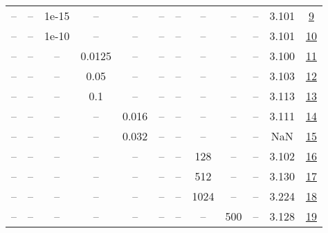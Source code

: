 \begin{table}[H]
\begin{tabular}{cccccccccccc}
-- & -- & 1e-15 & -- & -- & -- & -- & -- & -- & -- & 3.101 & \href{https://wandb.ai/stanford-mercury/optimizer-scaling/runs/sweep-520m-10B-mars77342alr0.008-wd0.1-minlr0-warmup2000-b10.95--6c9adf}{9} \\
-- & -- & 1e-10 & -- & -- & -- & -- & -- & -- & -- & 3.101 & \href{https://wandb.ai/stanford-mercury/optimizer-scaling/runs/sweep-520m-10B-marsa92a9dlr0.008-wd0.1-minlr0-warmup2000-b10.95--391f57}{10} \\
-- & -- & -- & 0.0125 & -- & -- & -- & -- & -- & -- & 3.100 & \href{https://wandb.ai/stanford-mercury/optimizer-scaling/runs/sweep-520m-10B-marsb386c8lr0.008-wd0.1-minlr0-warmup2000-b10.95--e1ca32}{11} \\
-- & -- & -- & 0.05 & -- & -- & -- & -- & -- & -- & 3.103 & \href{https://wandb.ai/stanford-mercury/optimizer-scaling/runs/sweep-520m-10B-marse74b34lr0.008-wd0.1-minlr0-warmup2000-b10.95--902394}{12} \\
-- & -- & -- & 0.1 & -- & -- & -- & -- & -- & -- & 3.113 & \href{https://wandb.ai/stanford-mercury/optimizer-scaling/runs/sweep-520m-10B-marst656743lr0.008-wd0.1-minlr0-warmup2000-b10.95-796b89}{13} \\
-- & -- & -- & -- & 0.016 & -- & -- & -- & -- & -- & 3.111 & \href{https://wandb.ai/stanford-mercury/optimizer-scaling/runs/sweep-520m-10B-mars1ad142lr0.016-wd0.1-minlr0-warmup2000-b10.95--96fc22}{14} \\
-- & -- & -- & -- & 0.032 & -- & -- & -- & -- & -- & NaN & \href{https://wandb.ai/stanford-mercury/optimizer-scaling/runs/sweep-520m-10B-marsbb494clr0.032-wd0.1-minlr0-warmup2000-b10.95--4cb91d}{15} \\
-- & -- & -- & -- & -- & -- & -- & 128 & -- & -- & 3.102 & \href{https://wandb.ai/stanford-mercury/optimizer-scaling/runs/sweep-520m-10B-marsfbbfc9lr0.008-wd0.1-minlr0-warmup2000-b10.95--e8c9e5}{16} \\
-- & -- & -- & -- & -- & -- & -- & 512 & -- & -- & 3.130 & \href{https://wandb.ai/stanford-mercury/optimizer-scaling/runs/sweep-520m-10B-mars5bfa62lr0.008-wd0.1-minlr0-warmup2000-b10.95--b53901}{17} \\
-- & -- & -- & -- & -- & -- & -- & 1024 & -- & -- & 3.224 & \href{https://wandb.ai/stanford-mercury/optimizer-scaling/runs/sweep-520m-10B-mars3d3d86lr0.008-wd0.1-minlr0-warmup2000-b10.95--f8862b}{18} \\
-- & -- & -- & -- & -- & -- & -- & -- & 500 & -- & 3.128 & \href{https://wandb.ai/stanford-mercury/optimizer-scaling/runs/sweep-520m-10B-mars5e3138lr0.008-wd0.1-minlr0-warmup500-b10.95-b-d4539f}{19} \\

\end{tabular}
\end{table}

